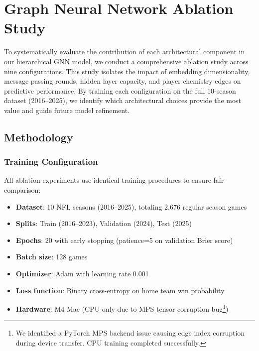 \section{Graph Neural Network Ablation Study}
\label{sec:gnn_ablation}

To systematically evaluate the contribution of each architectural component in our hierarchical GNN model, we conduct a comprehensive ablation study across nine configurations. This study isolates the impact of embedding dimensionality, message passing rounds, hidden layer capacity, and player chemistry edges on predictive performance. By training each configuration on the full 10-season dataset (2016--2025), we identify which architectural choices provide the most value and guide future model refinement.

\subsection{Methodology}
\label{subsec:gnn_ablation_methodology}

\subsubsection{Training Configuration}
All ablation experiments use identical training procedures to ensure fair comparison:

\begin{itemize}[noitemsep]
    \item \textbf{Dataset}: 10 NFL seasons (2016--2025), totaling 2,676 regular season games
    \item \textbf{Splits}: Train (2016--2023), Validation (2024), Test (2025)
    \item \textbf{Epochs}: 20 with early stopping (patience=5 on validation Brier score)
    \item \textbf{Batch size}: 128 games
    \item \textbf{Optimizer}: Adam with learning rate 0.001
    \item \textbf{Loss function}: Binary cross-entropy on home team win probability
    \item \textbf{Hardware}: M4 Mac (CPU-only due to MPS tensor corruption bug\footnote{We identified a PyTorch MPS backend issue causing edge index corruption during device transfer. CPU training completed successfully.})
\end{itemize}

